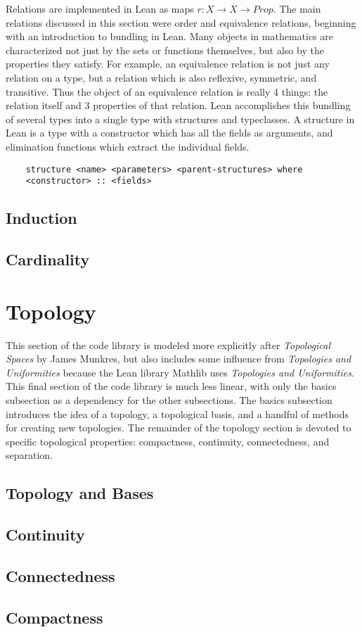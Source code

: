 Relations are implemented in Lean as maps $r:X\to X\to Prop$. The 
main relations discussed in this section were order and equivalence relations,
beginning with an introduction to bundling in Lean. Many objects in 
mathematics are characterized not just by the sets or functions themselves,
but also by the properties they satisfy. For example, an equivalence relation
is not just any relation on a type, but a relation which is also reflexive, 
symmetric, and transitive. Thus the object of an equivalence relation is really
4 things: the relation itself and 3 properties of that relation. Lean accomplishes
this bundling of several types into a single type with structures and typeclasses.
A structure in Lean is a type with a constructor which has all the fields
as arguments, and elimination functions which extract the individual fields.
\begin{verbatim}
    structure <name> <parameters> <parent-structures> where
    <constructor> :: <fields>
\end{verbatim}

\subsection{Induction}

\subsection{Cardinality}

\section{Topology}

This section of the code library is modeled more explicitly after 
\textit{Topological Spaces} by James Munkres, but also includes
some influence from \textit{Topologies and Uniformities} because 
the Lean library Mathlib uses \textit{Topologies and Uniformities}.
This final section of the code library is much less linear, with only the
basics subsection as a dependency for the other subsections. The basics
subsection introduces the idea of a topology, a topological basis, and 
a handful of methods for creating new topologies. The remainder of the 
topology section is devoted to specific topological properties:
compactness, continuity, connectedness, and separation.

\subsection{Topology and Bases}

\subsection{Continuity}

\subsection{Connectedness}

\subsection{Compactness}